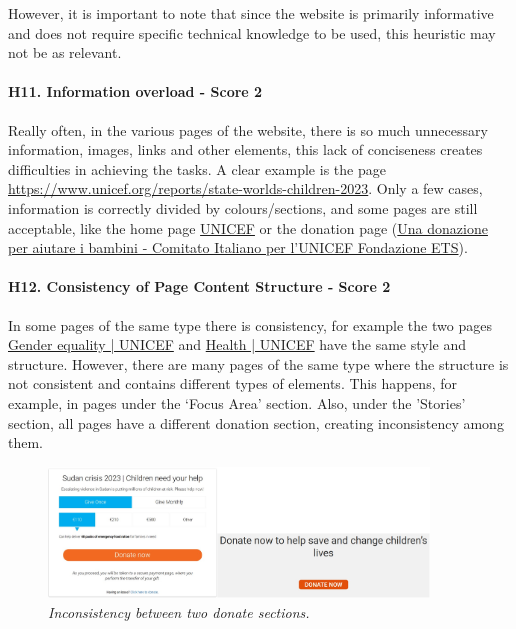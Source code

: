 \newline However, it is important to note that since the website is primarily informative and does not require specific technical knowledge to be used, this heuristic may not be as relevant.
\newline
\newline \paragraph{H11. Information overload - Score 2}  \label{subsec:H11}	Really often, in the various pages of the website, there is so much unnecessary information, images, links and other elements, this lack of conciseness creates difficulties in achieving the tasks. A clear example is the page \href{https://www.unicef.org/reports/state-worlds-children-2023}{https://www.unicef.org/reports/state-worlds-children-2023}.
\newline Only a few cases, information is correctly divided by colours/sections, and some pages are still acceptable, like the home page \href{https://www.unicef.org/}{UNICEF} or the donation page (\href{https://donazioni.unicef.it}{Una donazione per aiutare i bambini - Comitato Italiano per l'UNICEF Fondazione ETS}).
\newline
\newline \paragraph{H12. Consistency of Page Content Structure - Score 2}  \label{subsec:H12}	In some pages of the same type there is consistency, for example the two pages \href{https://www.unicef.org/gender-equality}{Gender equality | UNICEF} and \href{https://www.unicef.org/health}{Health | UNICEF} have the same style and structure.
\newline However, there are many pages of the same type where the structure is not consistent and contains different types of elements. This happens, for example, in pages under the ‘Focus Area’ section.
\newline Also, under the 'Stories' section, all pages have a different donation section, creating inconsistency among them.
\begin{figure}[!h]
	\begin{center}
		\includegraphics[width=0.9\textwidth]{FinalScores16.jpg}
		\captionsetup{font=small}
		\caption{\textit{Inconsistency between two donate sections.}}
	\end{center}
\end{figure}
